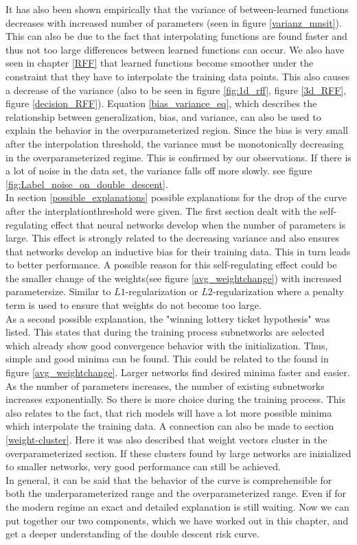 It has also been shown empirically that the variance of between-learned functions decreases with increased number of parameters (seen in figure \ref{varianz_mnsit}). This can also be due to the fact that interpolating functions are found faster and thus not too large differences between learned functions can occur. We also have seen in chapter \ref{RFF} that learned functions become smoother under the constraint that they have to interpolate the training data points. This also causes a decrease of the variance (also to be seen in figure \ref{fig:1d_rff}, figure \ref{3d_RFF}, figure \ref{decision_RFF}). Equation \ref{bias_variance_eq}, which describes the relationship between generalization, bias, and variance, can also be used to explain the behavior in the overparameterized region. Since the bias is very small after the interpolation threshold, the variance must be monotonically decreasing in the overparameterized regime. This is confirmed by our observations. If there is a lot of noise in the data set, the variance falls off more slowly. see  figure \ref{fig:Label_noise_on_double_descent}. \\
In section \ref{possible_explanations} possible explanations for the drop of the curve after the interplationthreshold were given.  The first section dealt with the self-regulating effect that neural networks develop when the number of parameters is large. This effect is strongly related to the decreasing variance and also ensures that networks develop an inductive bias for their training data. This in turn leads to better performance. A possible reason for this self-regulating effect could be the smaller change of the weights(see figure \ref{avg_weightchange}) with increased parametersize. Similar to $L1$-regularization or $L2$-regularization where a penalty term is used to ensure that weights do not become too large. \\
As a second possible explanation, the "winning lottery ticket hypothesis" was listed. This states that during the training process subnetworks are selected which already show good convergence behavior with the initialization. Thus, simple and good minima can be found. This could be related to the found in figure \ref{avg_weightchange}. Larger networks find desired minima faster and easier. As the number of parameters increases, the number of existing subnetworks increases exponentially. So there is more choice during the training process. This also relates to the fact, that rich models will have a lot more possible minima which interpolate the training data. A connection can also be made to section \ref{weight-cluster}. Here it was also described that weight vectors cluster in the overparameterized section. If these clusters found by large networks are inizialized to smaller networks, very good performance can still be achieved.\\
In general, it can be said that the behavior of the curve is comprehensible for both the underparameterized range and the overparameterized range.  Even if for the modern regime an exact and detailed explanation is still waiting. Now we can put together our two components, which we have worked out in this chapter, and get a deeper understanding of the double descent risk curve. 




    
    
    
    
